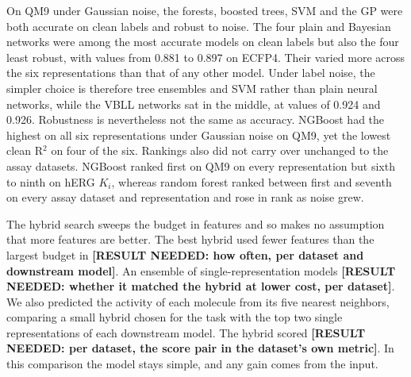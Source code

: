 On QM9 under Gaussian noise, the forests, boosted trees, SVM and the GP were both accurate on clean labels and robust to noise. The four plain and Bayesian networks were among the most accurate models on clean labels but also the four least robust, with \aucnorm{} values from 0.881 to 0.897 on ECFP4. Their \aucnorm{} varied more across the six representations than that of any other model. Under label noise, the simpler choice is therefore tree ensembles and SVM rather than plain neural networks, while the VBLL networks sat in the middle, at \aucnorm{} values of 0.924 and 0.926. Robustness is nevertheless not the same as accuracy. NGBoost had the highest \aucnorm{} on all six representations under Gaussian noise on QM9, yet the lowest clean R$^2$ on four of the six. Rankings also did not carry over unchanged to the assay datasets. NGBoost ranked first on QM9 on every representation but sixth to ninth on hERG $K_i$, whereas random forest ranked between first and seventh on every assay dataset and representation and rose in rank as noise grew.

The hybrid search sweeps the budget in features and so makes no assumption that more features are better. The best hybrid used fewer features than the largest budget in \textbf{[RESULT NEEDED: how often, per dataset and downstream model]}. An ensemble of single-representation models \textbf{[RESULT NEEDED: whether it matched the hybrid at lower cost, per dataset]}. We also predicted the activity of each molecule from its five nearest neighbors, comparing a small hybrid chosen for the task with the top two single representations of each downstream model. The hybrid scored \textbf{[RESULT NEEDED: per dataset, the score pair in the dataset's own metric]}. In this comparison the model stays simple, and any gain comes from the input.

